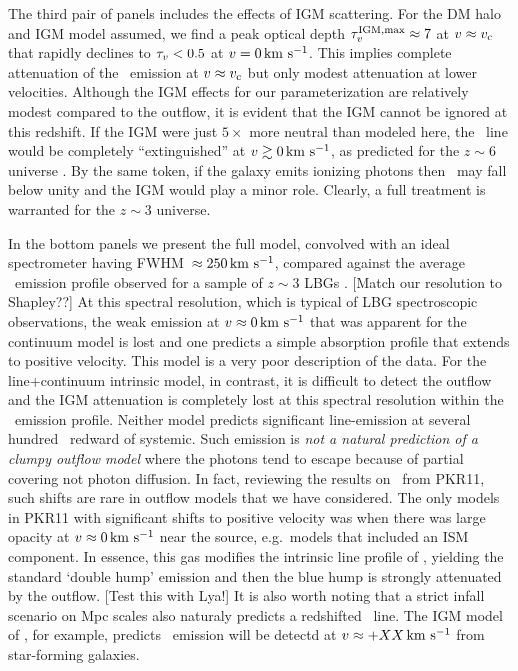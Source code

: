 \documentclass[12pt,preprint]{aastex}
\begin{document}
The third pair of panels includes the effects of IGM scattering.  For
the DM halo and IGM model assumed, we find a peak optical depth
$\tau_v^{\rm IGM, max} \approx 7$ at $v \approx v_{\rm c}$ that rapidly declines to
$\tau_v < 0.5$ at $v=0\, {\rm km~s^{-1}}$.  This implies complete attenuation of
the \lya\ emission at $v \approx v_{\rm c}$ but only modest
attenuation at lower velocities.  Although the IGM effects for our
parameterization are relatively modest compared to the outflow, it is evident that
the IGM cannot be ignored at this redshift.  If the IGM were just $5
\times$ more neutral than modeled here, the \lya\ line would be
completely ``extinguished'' at $v \gtrsim 0 \, {\rm km~s^{-1}}$, as predicted for
the $z \sim 6$ universe \citep{zheng+10a}.  By the same token, if the
galaxy emits ionizing photons then \tmax\ may fall below unity and the
IGM would play a minor role.  Clearly, a full treatment 
is warranted for the $z \sim 3$ universe.

In the bottom panels we present the full model, convolved with an
ideal spectrometer having FWHM~$\approx 250\, {\rm km~s^{-1}}$, compared against the
average \lya\ emission profile observed for a sample of $z \sim 3$ 
LBGs \citep{shapley03}. 
[Match our resolution to Shapley??]
At this spectral resolution, which is
typical of LBG spectroscopic observations, the weak emission at $v
\approx 0 \, {\rm km~s^{-1}}$ that was
apparent for the continuum model is lost and one predicts a simple
absorption profile that extends to positive velocity. 
This model is a very poor description of the data.  
For the line+continuum intrinsic model, in contrast, it is difficult
to detect the outflow and the IGM attenuation is completely lost at
this spectral resolution within the \lya\ emission profile.
Neither model predicts significant line-emission 
at several hundred \kms\ redward of systemic.  
Such emission is {\it not a natural prediction of a clumpy outflow
  model} where the photons tend to escape because of partial covering
not photon diffusion.  In fact, reviewing the
results on \mgii\ from PKR11, such shifts are rare in
outflow models that we have considered.  The only models in PKR11
with significant shifts to positive velocity was when there was large 
opacity at $v \approx 0 \, {\rm km~s^{-1}}$ near the source, e.g.\ models that
included an ISM component. In essence, this gas modifies the intrinsic
line profile of \lya, yielding the standard `double hump' emission and
then the blue hump is strongly attenuated by the outflow.
[Test this with Lya!] 
It is also worth noting that a strict infall scenario on Mpc scales
also naturaly predicts a redshifted \lya\ line.  The IGM model of
\cite{zheng+10}, for example, predicts \lya\ emission will be detectd
at $v \approx +XX \, {\rm km~s^{-1}}$ from star-forming galaxies.
\end{document}
